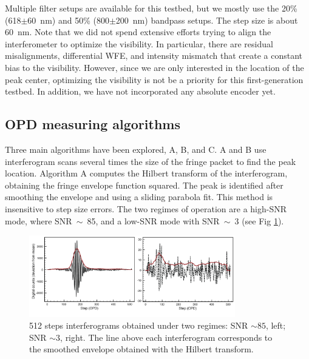Multiple filter setups are available for this testbed, but we mostly use the 20\% (618$\pm$60~nm) and 50\%  (800$\pm$200~nm) bandpass setups. The step size is about 60~nm. Note that we did not spend extensive efforts trying to align the interferometer to optimize the visibility. In particular, there are residual misalignments, differential WFE, and intensity mismatch that create a constant bias to the visibility. However, since we are only interested in the location of the peak center, optimizing the visibility is not be a priority for this first-generation testbed. In addition, we have not incorporated any absolute encoder yet.

\subsection{OPD measuring algorithms}
Three main algorithms have been explored, A, B, and C. A and B use interferogram scans several times the size of the fringe packet to find the peak location. Algorithm A computes the Hilbert transform of the interferogram, obtaining the fringe envelope function squared. The peak is identified after smoothing the envelope and using a sliding parabola fit. This method is insensitive to step size errors. The two regimes of operation are a high-SNR mode, where SNR~$\sim$~85, and a low-SNR mode with SNR~$\sim$~3 (see Fig \ref{fig:FirstScan}). 

\begin{figure}[ht!]
\begin{center}
\includegraphics[width=0.8\textwidth]{Figures/FirstScan2.png}
\caption{512 steps interferograms obtained under two regimes: SNR $\sim 85$, left; SNR $\sim 3$, right. The line above each interferogram corresponds to the smoothed envelope obtained with the Hilbert transform.}
\label{fig:FirstScan}
\end{center}
\end{figure}

